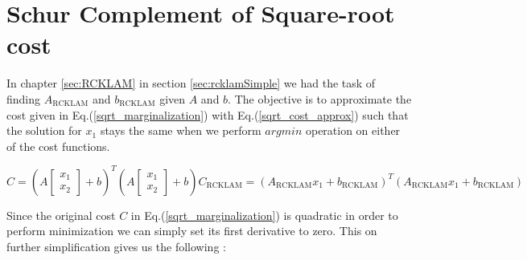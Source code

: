 \chapter{Schur Complement of Square-root cost}\label{sec:schur_sqrt_cost}

In chapter \ref{sec:RCKLAM} in section \ref{sec:rcklamSimple} we had the task of finding $A_\mathrm{RCKLAM}$ and $b_\mathrm{RCKLAM}$ given $A$ and $b$. The objective is to approximate the cost given in Eq.(\ref{sqrt_marginalization}) with Eq.(\ref{sqrt_cost_approx}) such that the solution for $x_1$ stays the same when we perform $argmin$ operation on either of the cost functions.

\begin{subequations}
  \begin{equation}
    C = \left(A\begin{bmatrix}x_1 \\ x_2\end{bmatrix} + b\right)^T\left(A\begin{bmatrix}x_1 \\ x_2\end{bmatrix} + b\right)
    \label{sqrt_marginalization}
  \end{equation}
  \begin{equation}
    C_\mathrm{RCKLAM} = \left(A_\mathrm{RCKLAM}x_1  + b_\mathrm{RCKLAM}\right)^T\left(A_\mathrm{RCKLAM}x_1  + b_\mathrm{RCKLAM}\right)
    \label{sqrt_cost_approx}
  \end{equation}
\end{subequations}

Since the original cost $C$ in Eq.(\ref{sqrt_marginalization}) is quadratic in order to perform minimization we can simply set its first derivative to zero. This on further simplification gives us the following : 

